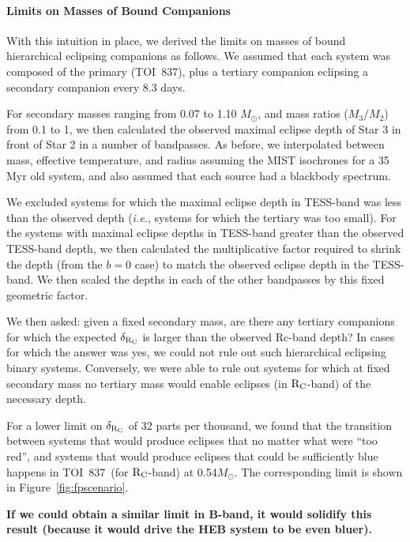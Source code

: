 \documentclass[12pt,twocolumn,tighten]{aastex62}
\newcommand{\tn}{TOI~837} %
\begin{document}
\paragraph{Limits on Masses of Bound Companions}

With this intuition in place, we derived the limits on masses of bound
hierarchical eclipsing companions as follows.  We assumed that each
system was composed of the primary (\tn), plus a tertiary companion
eclipsing a secondary companion every 8.3 days.

For secondary masses ranging from 0.07 to 1.10 $M_\odot$, and
mass ratios ($M_3/M_2$) from 0.1 to 1, we then 
calculated the observed maximal eclipse depth of Star 3 in front of
Star 2 in a number of bandpasses.
As before, we interpolated between mass, effective temperature, and radius
assuming the MIST isochrones for a 35$\,$Myr old system,
and also assumed that each source had a blackbody spectrum.

We excluded systems for which the maximal eclipse depth in TESS-band
was less than the observed depth ({\it i.e.}, systems for which the tertiary
was too small).
For the systems with maximal eclipse depths in TESS-band greater than
the observed TESS-band depth, we then calculated the multiplicative
factor required to shrink the depth (from the $b=0$ case) to match the
observed eclipse depth in the TESS-band.
We then scaled the depths in each of the other bandpasses by this
fixed geometric factor.

We then asked: given a fixed secondary mass, are there any tertiary
companions for which the expected $\delta_{\rm R_C}$ is larger than
the observed Rc-band depth?
In cases for which the answer was yes, we could not rule out such
hierarchical eclipsing binary systems.
Conversely, we were able to rule out systems
for which at fixed secondary mass no tertiary mass would
enable eclipses (in ${\rm R_C}$-band) of the necessary depth.

For a lower limit on $\delta_{\rm R_C}$ of 32 parts per thousand,
we found that the transition between systems that would produce
eclipses that no matter what were ``too red'', and systems that would
produce eclipses that could be sufficiently blue happens in \tn\ (for
${\rm R_C}$-band) at 0.54$M_\odot$.
The corresponding limit is shown in Figure~\ref{fig:fpscenario}.

{\bf If we could obtain a similar limit in B-band, it would 
	solidify this result (because it would drive the HEB system to be even bluer).}
\end{document}
